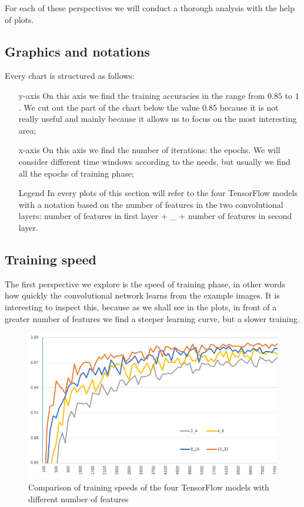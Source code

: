 For each of these perspectives we will conduct a thorough analysis with the help of plots.

\subsection{Graphics and notations}

Every chart is structured as follows:
\begin{itemize}
	\item[y-axis] On this axis we find the training accuracies in the range from $0.85$ to $1$. We cut out the part of the chart below the value $0.85$ because it is not really useful and mainly because it allows us to focus on the most interesting area;
	
	\item[x-axis] On this axis we find the number of iterations: the epochs. We will consider different time windows according to the needs, but usually we find all the epochs of training phase;
	
	\item[Legend] In every plots of this section will refer to the four TensorFlow models with a notation based on the number of features in the two convolutional layers: number of features in first layer + \_ + number of features in second layer.
\end{itemize}

\subsection{Training speed}

The first perspective we explore is the speed of training phase, in other words how quickly the convolutional network learns from the example images. It is interesting to inspect this, because as we shall see in the plots, in front of a greater number of features we find a steeper learning curve, but a slower training.

\begin{figure}
	\centering
	\includegraphics[width=1\textwidth]{Images/training_speed}
	\caption{Comparison of training speeds of the four TensorFlow models with different number of features}
	\label{fig:training_speed}
\end{figure}

